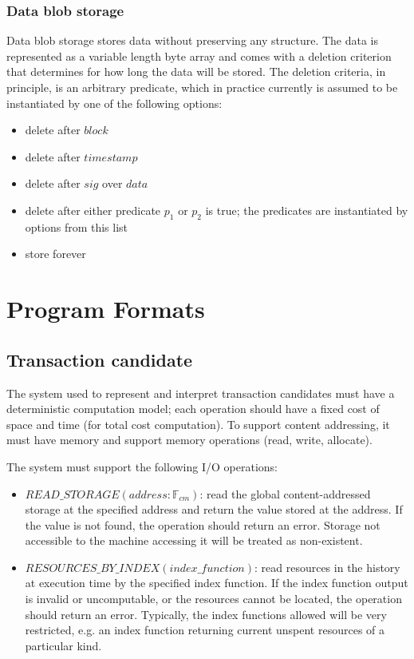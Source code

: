 \documentclass[
    11pt,            %
    techreport,        %
    affiltop,       %
]{art}
\begin{document}
\subsubsection{Data blob storage}

Data blob storage stores data without preserving any structure. The data is represented as a variable length byte array and comes with a deletion criterion that determines for how long the data will be stored. The deletion criteria, in principle, is an arbitrary predicate, which in practice currently is assumed to be instantiated by one of the following options:
\begin{itemize}
    \item delete after $block$
    \item delete after $timestamp$
    \item delete after $sig$ over $data$
    \item delete after either predicate $p_1$ or $p_2$ is true; the predicates are instantiated by options from this list
    \item store forever
\end{itemize}

\section{Program Formats}
\subsection{Transaction candidate} \label{tx-candidate-program-format} %
The system used to represent and interpret transaction candidates must have a deterministic computation model; each operation should have a fixed cost of space and time (for total cost computation). To support content addressing, it must have memory and support memory operations (read, write, allocate). 

The system must support the following I/O operations:
\begin{itemize}
    \item $READ\_STORAGE(address: \mathbb{F}_{cm})$: read the global content-addressed storage at the specified address and return the value stored at the address. If the value is not found, the operation should return an error. Storage not accessible to the machine accessing it will be treated as non-existent.
    \item $RESOURCES\_BY\_INDEX(index\_function)$: read resources in the history at execution time by the specified index function. If the index function output is invalid or uncomputable, or the resources cannot be located, the operation should return an error. Typically, the index functions allowed will be very restricted, e.g. an index function returning current unspent resources of a particular kind.
\end{itemize}
\end{document}
